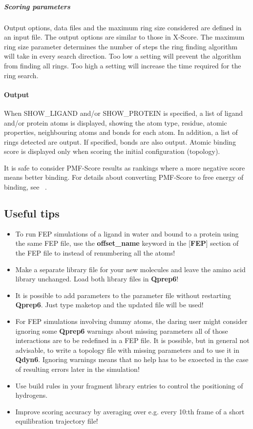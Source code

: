 \documentclass[a4paper,11pt]{article}
\let\origcite\cite
\def\cite#1{\unskip~\origcite{#1}}
\begin{document}
  \subparagraph{Scoring parameters}
  Output options, data files and the maximum ring size considered are defined in an input file. The output options are similar to those in X-Score. The maximum ring size parameter determines the number of steps the ring finding algorithm will take in every search direction. Too low a setting will prevent the algorithm from finding all rings. Too high a setting will increase the time required for the ring search.

  \paragraph{Output}
  When SHOW\_LIGAND and/or SHOW\_PROTEIN is specified, a list of ligand and/or protein atoms is displayed, showing the atom type, residue, atomic properties, neighbouring atoms and bonds for each atom. In addition, a list of rings detected are output. If specified, bonds are also output.
  Atomic binding score is displayed only when scoring the initial configuration (topology).

  It is safe to consider PMF-Score results as rankings where a more negative score means better binding. For details about converting PMF-Score to free energy of binding, see \cite{Muegge1999}.

\subsection{Useful tips}
\begin{itemize}
\item To run FEP simulations of a ligand in water and bound to a
protein using the same FEP file, use the \textbf{offset{\_}name}
keyword in the [\textbf{FEP}] section of the FEP file to instead
of renumbering all the atoms!
\item Make a separate library file for your new molecules
and leave the amino acid library unchanged. Load both library
files in \textbf{Qprep6}!
\item It is possible to add parameters to the parameter
file without restarting \textbf{Qprep6}. Just type maketop and the updated
file will be used!
\item For FEP simulations involving dummy
atoms, the daring user might consider ignoring some \textbf{Qprep6} warnings
about missing parameters all of those interactions are to be
redefined in a FEP file. It is possible, but in general not
advisable, to write a topology file with missing parameters and to
use it in \textbf{Qdyn6}. Ignoring warnings means that no help has to 
be exoected in the case of resulting errors later in the simulation!
\item Use build rules in your fragment library entries to control the
positioning of hydrogens.
\item Improve scoring accuracy by averaging over e.g. every 10:th frame
of a short equilibration trajectory file!
\end{itemize}
\end{document}
